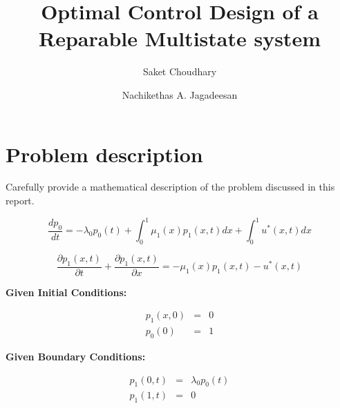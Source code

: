 \documentclass{ifacconf}
\begin{document}
\begin{frontmatter}


\title{
	Optimal Control Design of a Reparable Multistate system}%


\author[First]{Saket Choudhary} 
\author[Second]{Nachikethas A. Jagadeesan} 


\address[First]{University of Southern California, 
   LA, CA 90089 USA (e-mail: skchoudh@ usc.edu).}

\address[Second]{University of Southern California, 
   LA, CA 90089 USA (e-mail: nanantha@ usc.edu).}

\begin{abstract}                %

\end{abstract}

\begin{keyword}

\end{keyword}

\end{frontmatter}

\section{Problem description}
Carefully provide a mathematical description of the problem discussed in this report. 

\begin{equation}
\label{eq1}
\frac{dp_0}{dt} = -\lambda_0 p_0(t) + \int_0^1 \mu_1(x)p_1(x,t)dx + \int_0^1u^{*}(x,t)dx
\end{equation}

\begin{equation}
\label{eq2}
\frac{\partial p_1(x,t)}{\partial t} + \frac{\partial p_1(x,t)}{\partial x} = -\mu_1(x)p_1(x,t) - u^{*}(x,t)
\end{equation}


\textbf{Given Initial Conditions:}

\begin{eqnarray}
p_1(x,0) &=& 0\\
p_0(0) &=& 1
\end{eqnarray}

\textbf{Given Boundary Conditions:}

\begin{eqnarray}
p_1(0,t) &=& \lambda_0 p_0(t)\\
p_1(1,t) &=& 0
\end{eqnarray}
\end{document}
